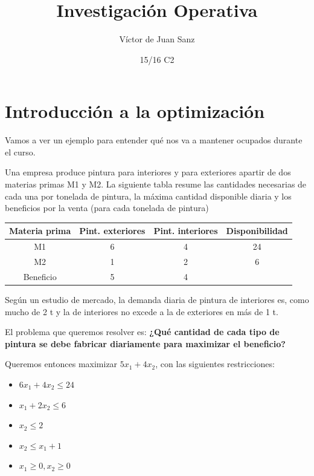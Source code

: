 \documentclass[palatino,nochap]{apuntes}
\title{Investigación Operativa}
\author{Víctor de Juan Sanz}
\date{15/16 C2}
\begin{document}
\begin{abstract}

\end{abstract}
\pagestyle{plain}
\maketitle

\tableofcontents
\newpage

\section{Introducción a la optimización}

Vamos a ver un ejemplo para entender qué nos va a mantener ocupados durante el curso.

\begin{example}
Una empresa produce pintura para interiores y para exteriores apartir de dos materias primas M1 y M2. 
La siguiente tabla resume las cantidades necesarias de cada una por tonelada de pintura, la máxima cantidad disponible diaria y los beneficios por la venta
(para cada tonelada de pintura)

\begin{center}
\begin{tabular}{cccc}
Materia prima&Pint. exteriores&Pint. interiores&Disponibilidad\\\hline\hline
M1&6&4&24\\
M2&1&2&6\\\hline
Beneficio&5&4&
\end{tabular}
\end{center}

Según un estudio de mercado, la demanda diaria de pintura de
interiores es, como mucho de 2 t y la de interiores no excede a la
de exteriores en más de 1 t.

El problema que queremos resolver es: \textbf{¿Qué cantidad de cada tipo de pintura se debe fabricar diariamente para maximizar el beneficio?}


Queremos entonces maximizar $5x_1 + 4x_2$, con las siguientes restricciones:

\begin{itemize}
	\item $6x_1 + 4x_2 \leq 24$
	\item $x_1 + 2x_2 \leq 6$
	\item $x_2 \leq 2$
	\item $x_2 \leq x_1 + 1$
	\item $x_1 \geq 0, x_2 \geq 0$
\end{itemize}



\end{example}
\end{document}
